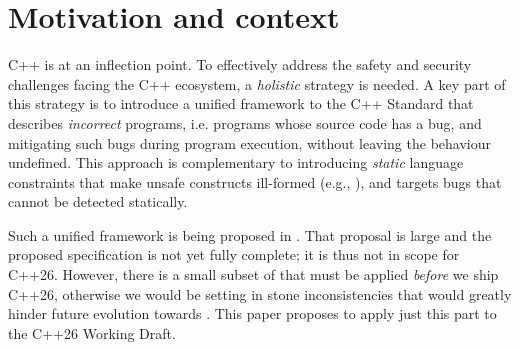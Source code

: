 


\section{Motivation and context}
\label{motivation}

C++ is at an inflection point. To effectively address the safety and security challenges facing the C++ ecosystem, a \emph{holistic} strategy is needed. A key part of this strategy is to introduce a unified framework to the C++ Standard that describes \emph{incorrect} programs, i.e. programs whose source code has a bug, and mitigating such bugs during program execution, without leaving the behaviour undefined. This approach is complementary to introducing \emph{static} language constraints that make unsafe constructs ill-formed (e.g., \cite{P3390R0}), and targets bugs that cannot be detected statically.

Such a unified framework is being proposed in \cite{P3100R1}. That proposal is large and the proposed specification is not yet fully complete; it is thus not in scope for C++26. However, there is a small subset of \cite{P3100R1} that must be applied \emph{before} we ship C++26, otherwise we would be setting in stone inconsistencies that would greatly hinder future evolution towards \cite{P3100R1}. This paper proposes to apply just this part to the C++26 Working Draft.

